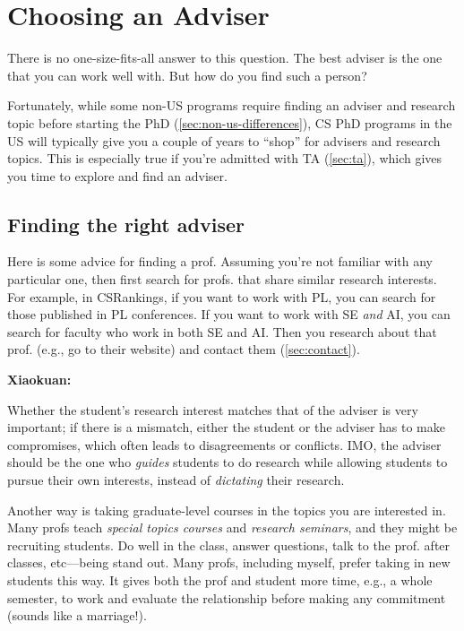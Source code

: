 \documentclass[oneside,11pt,dvipsnames]{book}
\newenvironment{commentbox}[1][]{
  \small
  \begin{mybox}
    {\small \textbf{#1}}
  }{
  \end{mybox}
}
\def\sectioninfo#1{%
  \addcontentsline{toc}{sectioninfo}{%
    \noexpand\numberline{}\color{black}{#1}}%
}
\begin{document}
\section{Choosing an Adviser}
\sectioninfo{The best adviser is the one that you can work well with. But you do not know that until you start working with them.}


There is no one-size-fits-all answer to this question. The best adviser is the one that you can work well with.  But how do you find such a person?

Fortunately, while some non-US programs require finding an adviser and research topic before starting the PhD (\autoref{sec:non-us-differences}), CS PhD programs in the US will typically give you a couple of years to ``shop'' for advisers and research topics.  This is especially true if you're admitted with TA (\autoref{sec:ta}), which gives you time to explore and find an adviser.

\subsection{Finding the right adviser}

Here is some advice for finding a prof.  Assuming you're not familiar with any particular one, then first search for profs. that share similar research interests.  For example, in CSRankings, if you want to work with PL, you can search for those published in PL conferences.  If you want to work with SE \emph{and} AI, you can search for faculty who work in both SE and AI.  Then you research about that prof. (e.g., go to their website) and contact them (\autoref{sec:contact}).

\begin{commentbox}[Xiaokuan:]
  Whether the student's research interest matches that of the adviser is very important;
  if there is a mismatch,
  either the student or the adviser has to make compromises,
  which often leads to disagreements or conflicts.
  IMO, the adviser should be the one who \emph{guides}  students to do research while allowing students to pursue their own interests,
  instead of \emph{dictating} their research.
\end{commentbox}


Another way is taking graduate-level courses in the topics you are interested in.  Many profs teach \emph{special topics courses} and \emph{research seminars}, and they might be recruiting students. Do well in the class, answer questions, talk to the prof. after classes, etc---being stand out.  Many profs, including myself, prefer taking in new students this way.  It gives both the prof and student more time, e.g., a whole semester, to work and evaluate the relationship before making any commitment (sounds like a marriage!).
\end{document}
